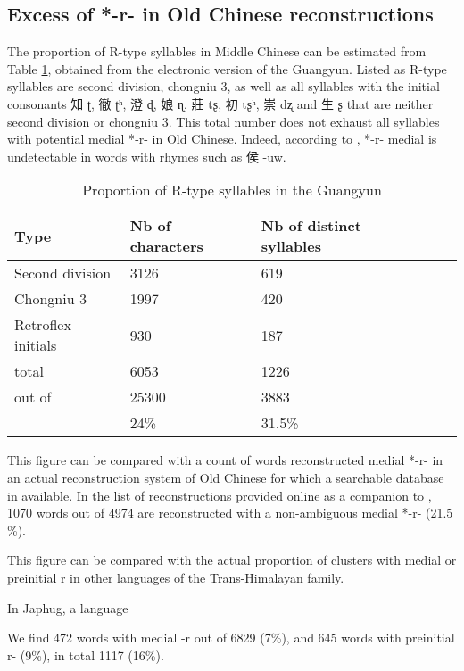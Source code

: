 \documentclass[oldfontcommands,oneside,a4paper,11pt]{article}
\newcommand{\ipa}[1]{{\phon \mbox{#1}}} %
\newcommand{\zh}[1]{{\cn #1}}
\begin{document}
\subsection{Excess of *-r- in Old Chinese reconstructions}
The proportion of R-type syllables in Middle Chinese can be estimated from Table \ref{tab:gy}, obtained from the electronic version of the Guangyun. Listed as R-type syllables are second division, chongniu 3, as well as all syllables with the initial consonants \zh{知} \ipa{ʈ}, \zh{徹} \ipa{ʈʰ},  \zh{澄} \ipa{ɖ},  \zh{娘} \ipa{ɳ},  \zh{莊} \ipa{tʂ},  \zh{初} \ipa{tʂʰ},  \zh{崇} \ipa{dʐ} and \zh{生} \ipa{ʂ} that are neither second division or chongniu 3. This total number does not exhaust all syllables with potential medial *\ipa{-r-} in Old Chinese. Indeed, according to  \citet[501]{baxter92}, *\ipa{-r-} medial is undetectable in words with rhymes such as \zh{侯} \ipa{-uw}. 

\begin{table}
\caption{Proportion of R-type syllables in the Guangyun} \label{tab:gy} \centering
\begin{tabular}{lllll}
\toprule
Type& Nb of characters & Nb of distinct syllables \\
\midrule
Second division	& 3126	 & 619 \\
Chongniu 3	& 1997	& 420 \\
Retroflex initials & 930	& 187 \\
\midrule
total&	6053	&1226\\
out of &	25300	&3883 \\
	&24\%	&31.5\% \\
	\bottomrule
\end{tabular}
\end{table}


This figure can be compared with a count of words reconstructed medial *\ipa{-r-} in an actual reconstruction system of Old Chinese for which a searchable database in available. In the list of reconstructions provided online as a companion to \citet{bs14oc}, 1070 words out of 4974 are reconstructed with a non-ambiguous medial *\ipa{-r-} (21.5 \%).

This figure can be compared with the actual proportion of clusters with medial or preinitial \ipa{r} in other languages of the Trans-Himalayan family.

In Japhug, a language

We find 472 words with medial \ipa{-r} out of 6829 (7\%), and 645 words with preinitial \ipa{r-} (9\%), in total 1117 (16\%).
\end{document}

